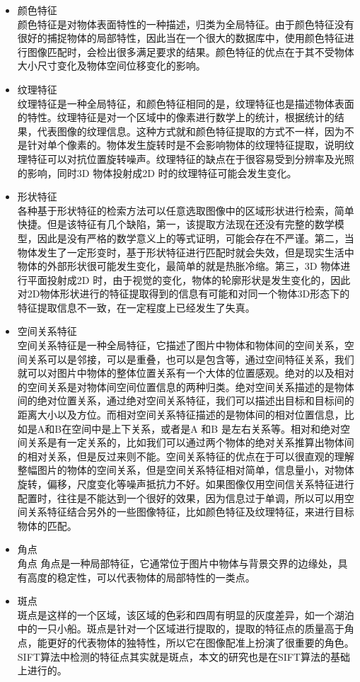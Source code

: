 \begin{itemize}
\item 颜色特征\\颜色特征是对物体表面特性的一种描述，归类为全局特征。由于颜色特征没有很好的捕捉物体的局部特性，因此当在一个很大的数据库中，使用颜色特征进行图像匹配时，会检出很多满足要求的结果。颜色特征的优点在于其不受物体大小尺寸变化及物体空间位移变化的影响。
\item 纹理特征\\纹理特征是一种全局特征，和颜色特征相同的是，纹理特征也是描述物体表面的特性。纹理特征是对一个区域中的像素进行数学上的统计，根据统计的结果，代表图像的纹理信息。这种方式就和颜色特征提取的方式不一样，因为不是针对单个像素的。物体发生旋转时是不会影响物体的纹理特征提取，说明纹理特征可以对抗位置旋转噪声。纹理特征的缺点在于很容易受到分辨率及光照的影响，同时3D 物体投射成2D 时的纹理特征可能会发生变化。
\item 形状特征\\各种基于形状特征的检索方法可以任意选取图像中的区域形状进行检索，简单快捷。但是该特征有几个缺陷，第一，该提取方法现在还没有完整的数学模型，因此是没有严格的数学意义上的等式证明，可能会存在不严谨。第二，当物体发生了一定形变时，基于形状特征进行匹配时就会失效，但是现实生活中物体的外部形状很可能发生变化，最简单的就是热胀冷缩。第三，3D 物体进行平面投射成2D 时，由于视觉的变化，物体的轮廓形状是发生变化的，因此对2D物体形状进行的特征提取得到的信息有可能和对同一个物体3D形态下的特征提取信息不一致，在一定程度上已经发生了失真。
\item 空间关系特征\\空间关系特征是一种全局特征，它描述了图片中物体和物体间的空间关系，空间关系可以是邻接，可以是重叠，也可以是包含等，通过空间特征关系，我们就可以对图片中物体的整体位置关系有一个大体的位置感观。绝对的以及相对的空间关系是对物体间空间位置信息的两种归类。绝对空间关系描述的是物体间的绝对位置关系，通过绝对空间关系特征，我们可以描述出目标和目标间的距离大小以及方位。而相对空间关系特征描述的是物体间的相对位置信息，比如是A和B在空间中是上下关系，或者是A 和B 是左右关系等。相对和绝对空间关系是有一定关系的，比如我们可以通过两个物体的绝对关系推算出物体间的相对关系，但是反过来则不能。空间关系特征的优点在于可以很直观的理解整幅图片的物体的空间关系，但是空间关系特征相对简单，信息量小，对物体旋转，偏移，尺度变化等噪声抵抗力不好。如果图像仅用空间信关系特征进行配置时，往往是不能达到一个很好的效果，因为信息过于单调，所以可以用空间关系特征结合另外的一些图像特征，比如颜色特征及纹理特征，来进行目标物体的匹配。
\item 角点 \\角点 角点是一种局部特征，它通常位于图片中物体与背景交界的边缘处，具有高度的稳定性，可以代表物体的局部特性的一类点。
\item 斑点\\斑点是这样的一个区域，该区域的色彩和四周有明显的灰度差异，如一个湖泊中的一只小船。斑点是针对一个区域进行提取的，提取的特征点的质量高于角点，能更好的代表物体的独特性，所以它在图像配准上扮演了很重要的角色。SIFT算法中检测的特征点其实就是斑点，本文的研究也是在SIFT算法的基础上进行的。
\end{itemize}
